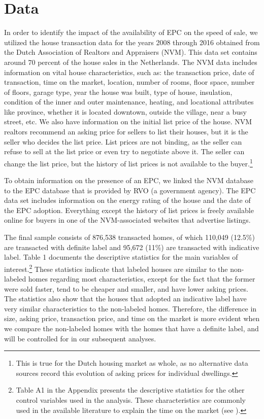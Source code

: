 \documentclass[12pt]{article}
\begin{document}
\section{Data}

In order to identify the impact of the availability of EPC on the speed of sale, we utilized the house transaction data for the years 2008 through 2016 obtained from the Dutch Association of Realtors and Appraisers (NVM). This data set contains around 70 percent of the house sales in the Netherlands. The NVM data includes information on vital house characteristics, such as: the transaction price, date of transaction, time on the market, location, number of rooms, floor space, number of floors, garage type, year the house was built, type of house, insulation, condition of the inner and outer maintenance, heating, and locational attributes like province, whether it is located downtown, outside the village, near a busy street, etc.  We also have information on the initial list price of the house. NVM realtors recommend an asking price for sellers to list their houses, but it is the seller who decides the list price. List prices are not binding, as the seller can refuse to sell at the list price or even try to negotiate above it. The seller can change the list price, but the history of list prices is not available to the buyer.\footnote{This is true for the Dutch housing market as whole, as no alternative data sources record this evolution of asking prices for individual dwellings.} 

To obtain information on the presence of an EPC, we linked the NVM database to the EPC database that is provided by RVO (a government agency). The EPC data set includes information on the energy rating of the house and the date of the EPC adoption. Everything except the history of list prices is freely available online for buyers in one of the NVM-associated websites that advertise listings. 

The final sample consists of 876,538 transacted homes, of which 110,049 (12.5\%) are transacted with definite label and 95,672 (11\%) are transacted with indicative label. Table 1 documents the descriptive statistics for the main variables of interest.\footnote{Table A1 in the Appendix presents the descriptive statistics for the other control variables used in the analysis. These characteristics are commonly used in the available literature to explain the time on the market (see \cite{sirmans2005composition,tucker2013days,merlo2004bargaining}).} These statistics indicate that labeled houses are similar to the non-labeled homes regarding most characteristics, except for the fact that the former were sold faster, tend to be cheaper and smaller, and have lower asking prices. The statistics also show that the houses that adopted an indicative label have very similar characteristics to the non-labeled homes. Therefore, the difference in size, asking price, transaction price, and time on the market is more evident when we compare the non-labeled homes with the homes that have a definite label, and will be controlled for in our subsequent analyses.
\end{document}
